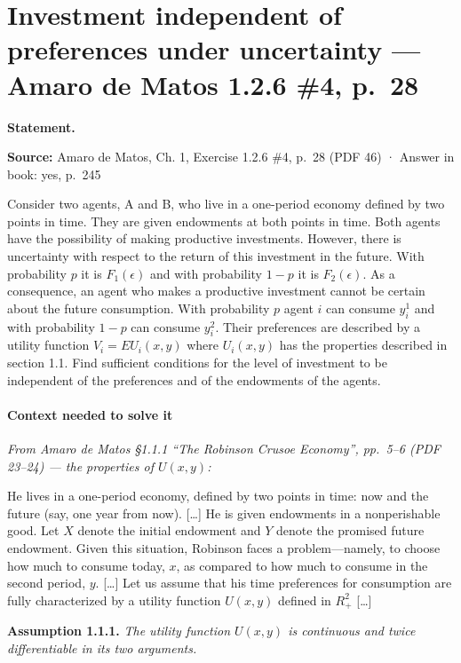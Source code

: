 \documentclass[11pt,a4paper]{article}
\numberwithin{equation}{section}
\newcommand{\stmtbegin}{\par\medskip\noindent\textbf{Statement.}\par\nopagebreak\begingroup\small\setlength{\tabcolsep}{3pt}\sloppy}
\begin{document}
\section{Investment independent of preferences under uncertainty --- Amaro de Matos 1.2.6 \#4, p.~28}
\stmtbegin
\textbf{Source:} Amaro de Matos, Ch. 1, Exercise 1.2.6 \#4, p.~28 (PDF 46) · Answer in book: yes,
p.~245

Consider two agents, A and B, who live in a one-period economy defined by two points in time. They
are given endowments at both points in time. Both agents have the possibility of making productive
investments. However, there is uncertainty with respect to the return of this investment in the
future. With probability \(p\) it is \(F_1(\epsilon)\) and with probability \(1 - p\) it is
\(F_2(\epsilon)\). As a consequence, an agent who makes a productive investment cannot be certain
about the future consumption. With probability \(p\) agent \(i\) can consume \(y_i^1\) and with
probability \(1 - p\) can consume \(y_i^2\). Their preferences are described by a utility function
\(V_i = EU_i(x, y)\) where \(U_i(x, y)\) has the properties described in section 1.1. Find
sufficient conditions for the level of investment to be independent of the preferences and of the
endowments of the agents.

\paragraph{Context needed to solve it}

\emph{From Amaro de Matos §1.1.1 ``The Robinson Crusoe Economy'', pp.~5--6 (PDF 23--24) --- the
properties of \(U(x, y)\):}

He lives in a one-period economy, defined by two points in time: now and the future (say, one year
from now). {[}\ldots{]} He is given endowments in a nonperishable good. Let \(X\) denote the initial
endowment and \(Y\) denote the promised future endowment. Given this situation, Robinson faces a
problem---namely, to choose how much to consume today, \(x\), as compared to how much to consume in
the second period, \(y\). {[}\ldots{]} Let us assume that his time preferences for consumption are
fully characterized by a utility function \(U(x, y)\) defined in \(R^2_+\) {[}\ldots{]}

\textbf{Assumption 1.1.1.} \emph{The utility function \(U(x, y)\) is continuous and twice
differentiable in its two arguments.}
\end{document}
